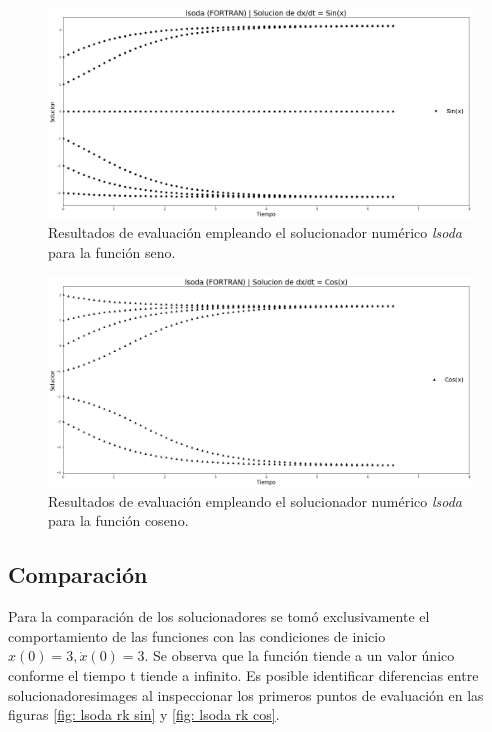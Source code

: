 \documentclass[12pt,letterpaper]{article}
\begin{document}
\begin{figure}[hb]
 \centering
 \includegraphics[scale=0.2]{img/lsoda_sin.png}
 \caption{Resultados de evaluación empleando el solucionador numérico \emph{lsoda} para la función seno.}
 \label{fig: lsoda sin}
\end{figure}

\begin{figure}[hb]
 \centering
 \includegraphics[scale=0.2]{img/lsoda_cos.png}
  \caption{Resultados de evaluación empleando el solucionador numérico \emph{lsoda} para la función coseno.}
 \label{fig: lsoda cos}
\end{figure}

\pagebreak

\subsection{Comparación}

Para la comparación de los solucionadores se tomó exclusivamente el comportamiento de las funciones con las condiciones de inicio $x(0) = 3, \dot{x}(0)=3$. Se observa que la función tiende a un valor único conforme el tiempo t tiende a infinito. Es posible identificar diferencias entre solucionadoresimages
al inspeccionar los primeros puntos de evaluación en las figuras \ref{fig: lsoda rk sin} y \ref{fig: lsoda rk cos}.
\end{document}

